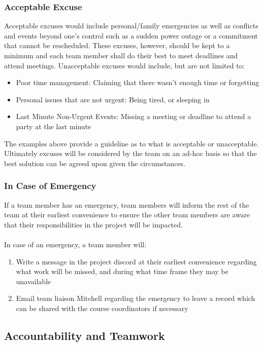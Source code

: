 \documentclass{article}
\begin{document}
\subsubsection*{Acceptable Excuse}

Acceptable excuses would include personal/family emergencies as well
as conflicts and events beyond one’s
control such as a sudden power outage or a commitment that cannot be
rescheduled. These excuses,
however, should be kept to a minimum and each team member shall do
their best to meet deadlines and
attend meetings. Unacceptable excuses would include, but are not limited to:\\
\begin{itemize}
  \item Poor time management: Claiming that there wasn’t enough time
    or forgetting
  \item Personal issues that are not urgent: Being tired, or sleeping in
  \item Last Minute Non-Urgent Events: Missing a meeting or deadline
    to attend a party at the last minute
\end{itemize}
The examples above provide a guideline as to what is acceptable or
unacceptable. Ultimately excuses will be
considered by the team on an ad-hoc basis so that the best solution
can be agreed upon given the
circumstances.

\subsubsection*{In Case of Emergency}

If a team member has an emergency, team members will inform the rest
of the team at their earliest
convenience to ensure the other team members are aware that their
responsibilities in the project will be
impacted.\\
\\
In case of an emergency, a team member will:
\begin{enumerate}
  \item Write a message in the project discord at their earliest
    convenience regarding what work will be missed,
    and during what time frame they may be unavailable
  \item Email team liaison Mitchell regarding the emergency to leave
    a record which can be shared with the
    course coordinators if necessary
\end{enumerate}

\subsection*{Accountability and Teamwork}
\end{document}
